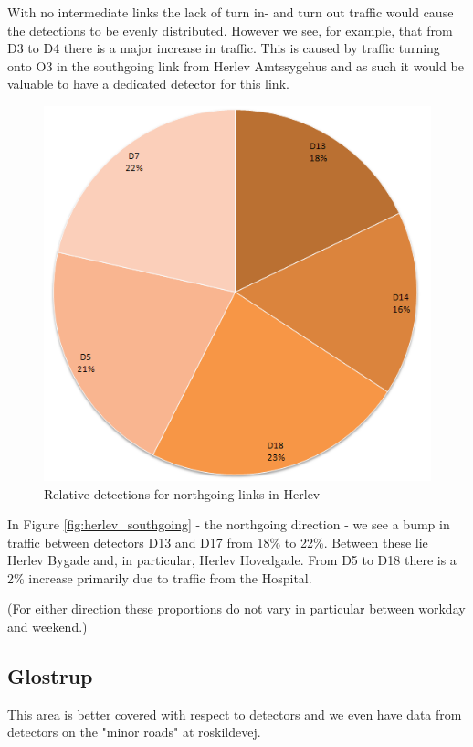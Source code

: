 With no intermediate links the lack of turn in- and turn out traffic would cause the detections to be evenly distributed. However we see, for example, that from D3 to D4 there is a major increase in traffic. This is caused by traffic turning onto O3 in the southgoing link from Herlev Amtssygehus and as such it would be valuable to have a dedicated detector for this link.

\begin{figure}[!ht]
\begin{center}
\includegraphics[scale=0.4]{herlev_northgoing_detectors.png} 
\end{center}
\caption{Relative detections for northgoing links in Herlev}
\label{fig:herlev_northgoing}
\end{figure}

In Figure \ref{fig:herlev_southgoing} - the northgoing direction - we see a bump in traffic between detectors D13 and D17 from 18\% to 22\%. Between these lie Herlev Bygade and, in particular, Herlev Hovedgade. From D5 to D18 there is a 2\% increase primarily due to traffic from the Hospital.

(For either direction these proportions do not vary in particular between workday and weekend.)

\subsection{Glostrup}
This area is better covered with respect to detectors and we even have data from detectors on the "minor roads" at roskildevej.